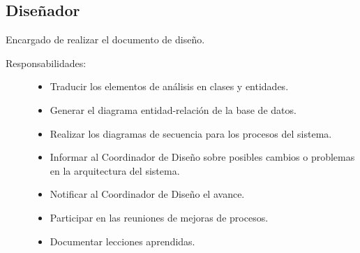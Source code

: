 \subsection{Diseñador}
	Encargado de realizar el documento de diseño.
\begin{description}
	\item[Responsabilidades:] \cdtEmpty 	
    \begin{itemize}
    	\item Traducir los elementos de análisis en clases y entidades.
    	\item Generar el diagrama entidad-relación de la base de datos.
    	\item Realizar los diagramas de secuencia para los procesos del sistema.
    	\item Informar al Coordinador de Diseño sobre posibles cambios o problemas en la arquitectura del sistema.
    	\item Notificar al Coordinador de Diseño el avance.
    	\item Participar en las reuniones de mejoras de procesos.
    	\item Documentar lecciones aprendidas.
    \end{itemize}
\end{description}

